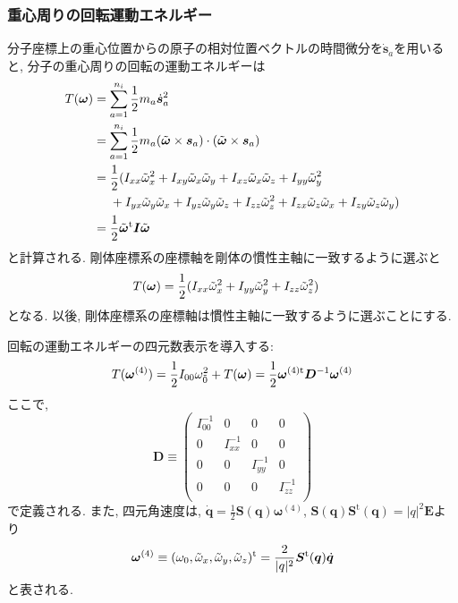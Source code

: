 \subsubsection{重心周りの回転運動エネルギー}
分子座標上の重心位置からの原子の相対位置ベクトルの時間微分を$\dot{\bm{s}}_{a}$を用いると, 分子の重心周りの回転の運動エネルギーは
\begin{align}
 T(\bm{\omega})
 &=
 \sum_{a=1}^{n_{i}} \frac{1}{2} m_{a} \dot{\bm{s}}_{a}^{2}
 \notag
 \\
 &=
 \sum_{a=1}^{n_{i}} \frac{1}{2} m_{a}
 (\tilde{\bm{\omega}} \times \bm{s}_{a})
 \cdot (\tilde{\bm{\omega}} \times \bm{s}_{a})
 \notag
 \\
 &=
 \frac{1}{2}
 (
 I_{xx} \Tilde{\omega}_{x}^{2}
+I_{xy} \Tilde{\omega}_{x}\Tilde{\omega}_{y}
+I_{xz} \Tilde{\omega}_{x}\Tilde{\omega}_{z}
+I_{yy} \Tilde{\omega}_{y}^{2}
\notag
\\ &~~~~
+I_{yx} \Tilde{\omega}_{y}\Tilde{\omega}_{x}
+I_{yz} \Tilde{\omega}_{y}\Tilde{\omega}_{z}
+I_{zz} \Tilde{\omega}_{z}^{2}
+I_{zx} \Tilde{\omega}_{z}\Tilde{\omega}_{x}
+I_{zy} \Tilde{\omega}_{z}\Tilde{\omega}_{y}
 )
 \notag \\
 &=
  \frac{1}{2}
  \Tilde{\bm{\omega}}^{\mathrm{t}} \bm{I} \Tilde{\bm{\omega}}
\label{eq:RigidBodyMD17}
\end{align}
と計算される. 剛体座標系の座標軸を剛体の慣性主軸に一致するように選ぶと
\begin{align}
 T(\bm{\omega})
 &=
 \frac{1}{2}
 (
 I_{xx} \Tilde{\omega}_{x}^{2}
+I_{yy} \Tilde{\omega}_{y}^{2}
+I_{zz} \Tilde{\omega}_{z}^{2}
 )
\label{eq:RigidBodyMD18}
\end{align}
となる. 以後, 剛体座標系の座標軸は慣性主軸に一致するように選ぶことにする.

回転の運動エネルギーの四元数表示を導入する:
\begin{equation}
 T(\bm{\omega}^{(4)})
  =
  \frac{1}{2}I_{00}\omega_{\Tilde{0}}^{2} + T(\bm{\omega})
  =
  \frac{1}{2} \bm{\omega}^{(4) \mathrm{t}} \bm{D}^{-1} \bm{\omega}^{(4)}
\label{eq:RigidBodyMD19}
\end{equation}
ここで, 
\begin{equation}
 \bm{D}
 \equiv
 \begin{pmatrix}
  I^{-1}_{00} & 0           & 0           & 0           \\
  0           & I^{-1}_{xx} & 0           & 0           \\
  0           & 0           & I^{-1}_{yy} & 0           \\
  0           & 0           & 0           & I^{-1}_{zz} \\
 \end{pmatrix}
\label{eq:RigidBodyMD21}
\end{equation}
で定義される. また, 四元角速度は, $\dot{\bm{q}} = \frac{1}{2} \bm{S}(\bm{q}) \bm{\omega}^{(4)}$, $\bm{S}(\bm{q})\bm{S}^{\mathrm{t}}(\bm{q}) = |q|^{2} \bm{E}$より
\begin{equation}
 \bm{\omega}^{(4)}
  \equiv
  (\omega_{0},\Tilde{\omega}_{x},\Tilde{\omega}_{y},\Tilde{\omega}_{z})^{\mathrm{t}}
  =
  \frac{2}{|q|^{2}}\bm{S}^{\mathrm{t}} (\bm{q}) \dot{\bm{q}}
\label{eq:RigidBodyMD20}
\end{equation}
と表される.

